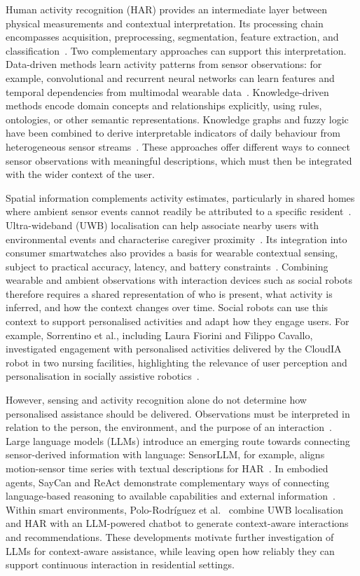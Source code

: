 \documentclass[10pt,twocolumn]{article}
\begin{document}
Human activity recognition (HAR) provides an intermediate layer between physical measurements and contextual interpretation. Its processing chain encompasses acquisition, preprocessing, segmentation, feature extraction, and classification~\cite{bulling2014tutorial}. Two complementary approaches can support this interpretation. Data-driven methods learn activity patterns from sensor observations: for example, convolutional and recurrent neural networks can learn features and temporal dependencies from multimodal wearable data~\cite{ordonez2016deep}. Knowledge-driven methods encode domain concepts and relationships explicitly, using rules, ontologies, or other semantic representations. Knowledge graphs and fuzzy logic have been combined to derive interpretable indicators of daily behaviour from heterogeneous sensor streams~\cite{polo2025health}. These approaches offer different ways to connect sensor observations with meaningful descriptions, which must then be integrated with the wider context of the user.

Spatial information complements activity estimates, particularly in shared homes where ambient sensor events cannot readily be attributed to a specific resident~\cite{liu2007positioning,poloMultiOccupancy}. Ultra-wideband (UWB) localisation can help associate nearby users with environmental events and characterise caregiver proximity~\cite{polo2024social}. Its integration into consumer smartwatches also provides a basis for wearable contextual sensing, subject to practical accuracy, latency, and battery constraints~\cite{anguita2025uwb}. Combining wearable and ambient observations with interaction devices such as social robots therefore requires a shared representation of who is present, what activity is inferred, and how the context changes over time. Social robots can use this context to support personalised activities and adapt how they engage users. For example, Sorrentino et al., including Laura Fiorini and Filippo Cavallo, investigated engagement with personalised activities delivered by the CloudIA robot in two nursing facilities, highlighting the relevance of user perception and personalisation in socially assistive robotics~\cite{sorrentino2023cloudia}.

However, sensing and activity recognition alone do not determine how personalised assistance should be delivered. Observations must be interpreted in relation to the person, the environment, and the purpose of an interaction~\cite{dey2001context}. Large language models (LLMs) introduce an emerging route towards connecting sensor-derived information with language: SensorLLM, for example, aligns motion-sensor time series with textual descriptions for HAR~\cite{li2025sensorllm}. In embodied agents, SayCan and ReAct demonstrate complementary ways of connecting language-based reasoning to available capabilities and external information~\cite{ahn2022saycan,yao2023react}. Within smart environments, Polo-Rodr{\'i}guez et al.~\cite{polo2025chatbots} combine UWB localisation and HAR with an LLM-powered chatbot to generate context-aware interactions and recommendations. These developments motivate further investigation of LLMs for context-aware assistance, while leaving open how reliably they can support continuous interaction in residential settings.
\end{document}
